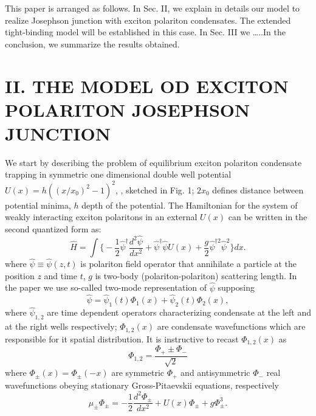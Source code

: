 \documentclass[aps,prl,preprint,groupedaddress]{revtex4-1}
\begin{document}
This paper is arranged as follows. In Sec. II, we explain in details our model to realize Josephson junction with exciton polariton condensates.  The extended tight-binding model will be established in this case. In Sec. III we …..In the conclusion, we summarize the results obtained.

\section{II. THE MODEL OD EXCITON POLARITON JOSEPHSON JUNCTION}
We start by describing the problem of equilibrium exciton polariton condensate trapping in symmetric one dimensional double well potential  $U(x) = h ((x/x_0)^2 - 1)^2$, , sketched in Fig. 1; $2x_0$ defines 
distance between potential minima, $h$ depth of the potential. The Hamiltonian for the system of weakly interacting exciton polaritons  in an external $U(x)$  can be written in the second quantized form as:
\begin{equation}
\hat{H} = \int \Big\{ -\dfrac{1}{2} \hat{\psi}^\dag \dfrac{d^2 \hat{\psi}}{dx^2} + \hat{\psi}^\dag \hat{\psi} U(x) + \dfrac{g}{2} \hat{\psi}^{\dag 2} \hat{\psi}^2  \Big\} dx.
\label{eq:gpe_hamiltonian}
\end{equation}
where $\hat{\psi} \equiv \hat{\psi}(z,t)$ is polariton  field operator that annihilate a particle at the position $z$ and time $t$, $g$  is two-body (polariton-polariton) scattering length. In the paper we use so-called  two-mode representation of $\hat{\psi}$ supposing 
\begin{equation}
\hat{\psi} = \hat{\psi}_1(t) \Phi_1(x) + \hat{\psi}_2(t) \Phi_2(x),
\label{eq:two_modes}
\end{equation}
where $\hat{\psi}_{1,2}$ are time dependent operators characterizing condensate at the left and at the right wells respectively; $\Phi_{1,2}(x)$ are condensate  wavefunctions which are responsible for it spatial distribution. It is instructive to recast $\Phi_{1,2}(x)$ as
\begin{equation}
\Phi_{1,2} = \dfrac{\Phi_+ \pm \Phi_-}{\sqrt{2}}
\label{eq:conditions}
\end{equation}
where $\Phi_{\pm}(x) = \Phi_{\pm}(-x)$ are symmetric $\Phi_+$ and antisymmetric $\Phi_-$ real  wavefunctions obeying  stationary Gross-Pitaevskii equations, respectively
\begin{equation}
\mu_{\pm} \Phi_{\pm} = -\dfrac{1}{2} \dfrac{d^2 \Phi_{\pm}}{dx^2} + U(x) \Phi_{\pm} + g \Phi_{\pm}^3.
\label{eq:stationary}
\end{equation}
\end{document}
